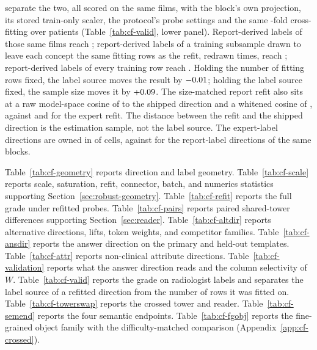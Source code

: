 \documentclass{article}
\begin{document}
separate the two, all scored on the same films, with the block's own projection, its stored train-only scaler, the protocol's probe settings and the same \cfVfArmFolds{}-fold cross-fitting over patients (Table~\ref{tab:cf-valid}, lower panel). Report-derived labels of those same \cfVfArmRows{} films reach \cfVfArmReportSameFilmsAuroc{}; report-derived labels of a training subsample drawn to leave each concept the same \cfVfArmReportSubRows{} fitting rows as the refit, redrawn \cfVfArmDraws{} times, reach \cfVfArmReportSubAuroc{}; report-derived labels of every training row reach \cfVfArmReportFullAuroc{}. Holding the number of fitting rows fixed, the label source moves the result by $-0.01$; holding the label source fixed, the sample size moves it by $+0.09$. The size-matched report refit also sits at a raw model-space cosine of \cfVfArmReportSubCos{} to the shipped direction and a whitened cosine of \cfVfArmReportSubCosWhite{}, against \cfVfArmExpertCos{} and \cfVfArmExpertCosWhite{} for the expert refit. The distance between the refit and the shipped direction is the estimation sample, not the label source. The expert-label directions are owned in \cfValidfitOwnedExpert{} of \cfValidfitCells{} cells, against \cfValidfitOwnedReport{} for the report-label directions of the same blocks.

Table~\ref{tab:cf-geometry} reports direction and label geometry. Table~\ref{tab:cf-scale} reports scale, saturation, refit, connector, batch, and numerics statistics supporting Section~\ref{sec:robust-geometry}. Table~\ref{tab:cf-refit} reports the full grade under refitted probes. Table~\ref{tab:cf-pairs} reports paired shared-tower differences supporting Section~\ref{sec:reader}. Table~\ref{tab:cf-altdir} reports alternative directions, lifts, token weights, and competitor families. Table~\ref{tab:cf-ansdir} reports the answer direction on the primary and held-out templates. Table~\ref{tab:cf-attr} reports non-clinical attribute directions. Table~\ref{tab:cf-validation} reports what the answer direction reads and the column selectivity of $W$. Table~\ref{tab:cf-valid} reports the grade on radiologist labels and separates the label source of a refitted direction from the number of rows it was fitted on. Table~\ref{tab:cf-towerswap} reports the crossed tower and reader. Table~\ref{tab:cf-semend} reports the four semantic endpoints. Table~\ref{tab:cf-fgobj} reports the fine-grained object family with the difficulty-matched comparison (Appendix~\ref{app:cf-crossed}).
\end{document}
